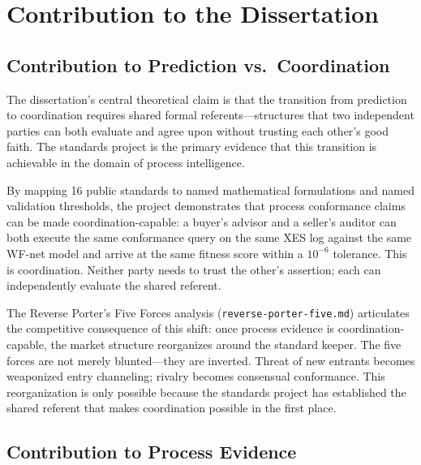 
\section{Contribution to the Dissertation}
\label{sec:standards-contribution}

\subsection{Contribution to Prediction vs.~Coordination}
\label{sec:standards-contribution-prediction}

The dissertation's central theoretical claim is that the transition from prediction to
coordination requires shared formal referents---structures that two independent parties
can both evaluate and agree upon without trusting each other's good faith. The standards
project is the primary evidence that this transition is achievable in the domain of
process intelligence.

By mapping 16 public standards to named mathematical formulations and named validation
thresholds, the project demonstrates that process conformance claims can be made
coordination-capable: a buyer's advisor and a seller's auditor can both execute the same
conformance query on the same XES log against the same WF-net model and arrive at the
same fitness score within a $10^{-6}$ tolerance. This is coordination. Neither party
needs to trust the other's assertion; each can independently evaluate the shared referent.

The Reverse Porter's Five Forces analysis (\texttt{reverse-porter-five.md}) articulates
the competitive consequence of this shift: once process evidence is coordination-capable,
the market structure reorganizes around the standard keeper. The five forces are not
merely blunted---they are inverted. Threat of new entrants becomes weaponized entry
channeling; rivalry becomes consensual conformance. This reorganization is only possible
because the standards project has established the shared referent that makes coordination
possible in the first place.

\subsection{Contribution to Process Evidence}
\label{sec:standards-contribution-evidence}

